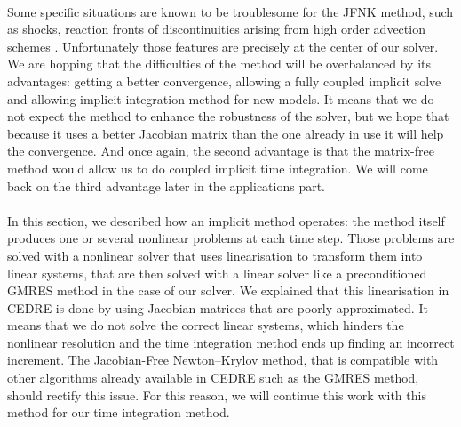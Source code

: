       \paragraph{}
      Some specific situations are known to be troublesome for the JFNK method, such as shocks, reaction fronts of discontinuities arising from high order advection schemes \cite{KnollKeyes2004}.
      Unfortunately those features are precisely at the center of our solver.
      We are hopping that the difficulties of the method will be overbalanced by its advantages: getting a better convergence, allowing a fully coupled implicit solve and allowing implicit integration method for new models.
      It means that we do not expect the method to enhance the robustness of the solver, but we hope that because it uses a better Jacobian matrix than the one already in use it will help the convergence.
      And once again, the second advantage is that the matrix-free method would allow us to do coupled implicit time integration.
      We will come back on the third advantage later in the applications part.


    \paragraph{}
    In this section, we described how an implicit method operates: the method itself produces one or several nonlinear problems at each time step.
    Those problems are solved with a nonlinear solver that uses linearisation to transform them into linear systems, that are then solved with a linear solver like a preconditioned GMRES method in the case of our solver.
    We explained that this linearisation in CEDRE is done by using Jacobian matrices that are poorly approximated.
    It means that we do not solve the correct linear systems, which hinders the nonlinear resolution and the time integration method ends up finding an incorrect increment.
    The Jacobian-Free Newton--Krylov method, that is compatible with other algorithms already available in CEDRE such as the GMRES method,  should rectify this issue.
    For this reason, we will continue this work with this method for our time integration method.
